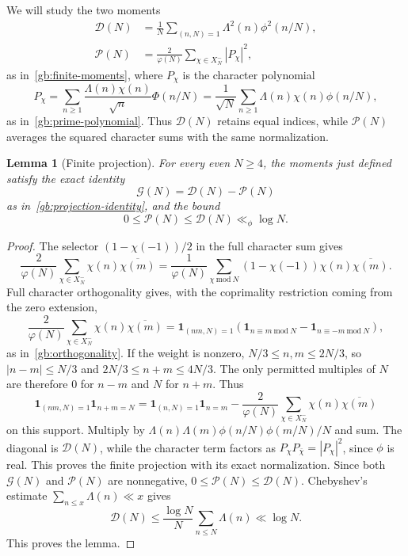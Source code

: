 \documentclass[12pt,a4paper]{amsart}
\numberwithin{equation}{section}
\def\le{\leqslant}
\def\ge{\geqslant}
\theoremstyle{plain}
\newtheorem{lemma}[proposition]{Lemma}
\theoremstyle{definition}
\theoremstyle{remark}
\begin{document}
We will study the two moments
\[
 \begin{aligned}
 \mathcal D(N)&=\frac1N\sum_{(n,N)=1}\Lambda^2(n)\phi^2(n/N),\\
 \mathcal P(N)&=\frac2{\varphi(N)}\sum_{\chi\in X_N^-}|P_\chi|^2,
 \end{aligned}
\]
as in~\eqref{gb:finite-moments},
where $P_\chi$ is the character polynomial
\[
 P_\chi=\sum_{n\ge1}\frac{\Lambda(n)\chi(n)}{\sqrt n}\Phi(n/N)
       =\frac1{\sqrt N}\sum_{n\ge1}\Lambda(n)\chi(n)\phi(n/N),
\]
as in~\eqref{gb:prime-polynomial}.
Thus $\mathcal D(N)$ retains equal indices, while $\mathcal P(N)$
averages the squared character sums with the same normalization.

\begin{lemma}[Finite projection]\label{proof:v9:finite-projection}
For every even $N\ge4$, the moments just defined satisfy the exact identity
\[
 \mathcal G(N)=\mathcal D(N)-\mathcal P(N)
\]
as in~\eqref{gb:projection-identity},
and the bound
\begin{equation}\label{proof:dir:moment-bound}
 0\le\mathcal P(N)\le\mathcal D(N)\ll_\phi\log N.
\end{equation}
\end{lemma}

\begin{proof}
The selector $(1-\chi(-1))/2$ in the full character sum gives
\[
 \frac2{\varphi(N)}\sum_{\chi\in X_N^-}\chi(n)\overline{\chi(m)}
 =\frac1{\varphi(N)}\sum_{\chi\ \mathrm{mod}\ N}
       (1-\chi(-1))\chi(n)\overline{\chi(m)}.
\]
Full character orthogonality gives, with the coprimality restriction
coming from the zero extension,
\[
 \frac2{\varphi(N)}\sum_{\chi\in X_N^-}\chi(n)\overline{\chi(m)}
 =\mathbf1_{(nm,N)=1}
   \left(\mathbf1_{n\equiv m\ \mathrm{mod}\ N}
              -\mathbf1_{n\equiv-m\ \mathrm{mod}\ N}\right),
\]
as in~\eqref{gb:orthogonality}.
If the weight is nonzero, $N/3\le n,m\le2N/3$, so
$|n-m|\le N/3$ and $2N/3\le n+m\le4N/3$.
The only permitted multiples of $N$ are therefore $0$ for $n-m$
and $N$ for $n+m$. Thus
\[
 \mathbf1_{(nm,N)=1}\mathbf1_{n+m=N}
 =\mathbf1_{(n,N)=1}\mathbf1_{n=m}
  -\frac2{\varphi(N)}\sum_{\chi\in X_N^-}
                 \chi(n)\overline{\chi(m)}
\]
on this support. Multiply by
$\Lambda(n)\Lambda(m)\phi(n/N)\phi(m/N)/N$ and sum.
The diagonal is $\mathcal D(N)$, while the character term factors
as $P_\chi P_{\bar\chi}=|P_\chi|^2$, since $\phi$ is real.
This proves the finite projection with its exact normalization.
Since both $\mathcal G(N)$ and $\mathcal P(N)$ are nonnegative,
$0\le\mathcal P(N)\le\mathcal D(N)$. Chebyshev's estimate
$\sum_{n\le x}\Lambda(n)\ll x$ gives
\[
 \mathcal D(N)\le\frac{\log N}{N}\sum_{n\le N}\Lambda(n)\ll\log N.
\]
This proves the lemma.
\end{proof}
\end{document}
